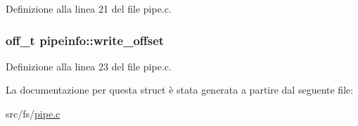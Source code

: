 Definizione alla linea 21 del file pipe.\+c.

\hypertarget{structpipeinfo_abb510c9ed7b4d0bc60432bcc04e3962b}{
\subsubsection[{write\+\_\+offset}]{\setlength{\rightskip}{0pt plus 5cm}off\+\_\+t pipeinfo\+::write\+\_\+offset}}\label{structpipeinfo_abb510c9ed7b4d0bc60432bcc04e3962b}


Definizione alla linea 23 del file pipe.\+c.



La documentazione per questa struct è stata generata a partire dal seguente file\+:\begin{DoxyCompactItemize}
\item 
src/fs/\hyperlink{pipe_8c}{pipe.\+c}\end{DoxyCompactItemize}
